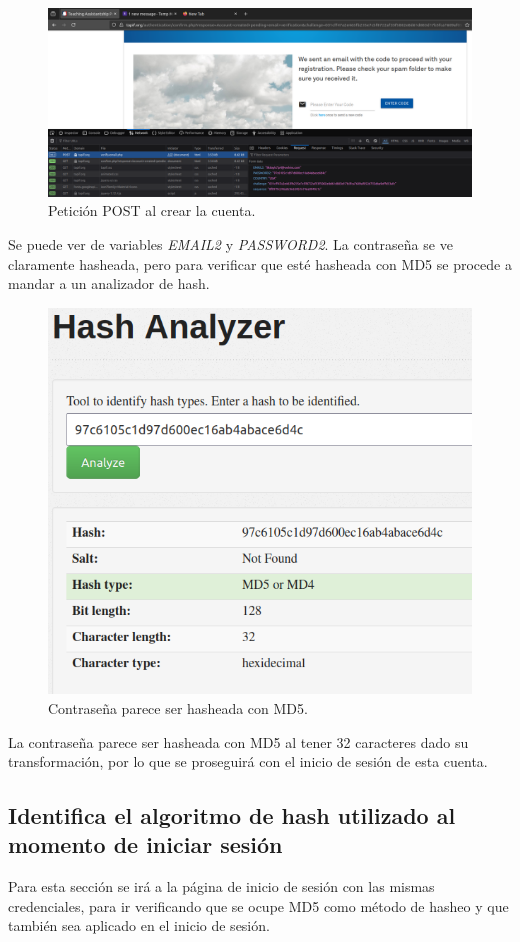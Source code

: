 \documentclass[letter,12pt]{article}
\begin{document}
\begin{figure}[H]
            \centering
            \includegraphics[width=1.5\linewidth]{resultadosregister.png}
        \caption{\label{fig:3} Petición POST al crear la cuenta.}
    \end{figure}

Se puede ver de variables \textit{EMAIL2} y \textit{PASSWORD2}. La contraseña se ve claramente hasheada, pero para verificar que esté hasheada con MD5 se procede a mandar a un analizador de hash.

\begin{figure}[H]
            \centering
            \includegraphics[width=0.5\linewidth]{hashanalyzer.png}
        \caption{\label{fig:4} Contraseña parece ser hasheada con MD5.}
    \end{figure}

La contraseña parece ser hasheada con MD5 al tener 32 caracteres dado su transformación, por lo que se proseguirá con el inicio de sesión de esta cuenta.

\subsection{Identifica el algoritmo de hash utilizado al momento de iniciar sesión}

Para esta sección se irá a la página de inicio de sesión con las mismas credenciales, para ir verificando que se ocupe MD5 como método de hasheo y que también sea aplicado en el inicio de sesión.
\end{document}
